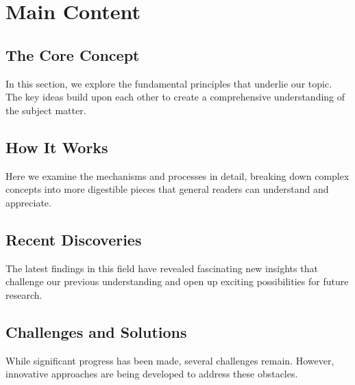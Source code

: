 %
%

\section{Main Content}
\subsection{The Core Concept}
In this section, we explore the fundamental principles that underlie our topic. 
The key ideas build upon each other to create a comprehensive understanding of the subject matter.

\subsection{How It Works}
Here we examine the mechanisms and processes in detail, breaking down complex concepts 
into more digestible pieces that general readers can understand and appreciate.

\subsection{Recent Discoveries}
The latest findings in this field have revealed fascinating new insights that challenge 
our previous understanding and open up exciting possibilities for future research.

\subsection{Challenges and Solutions}
While significant progress has been made, several challenges remain. However, innovative 
approaches are being developed to address these obstacles.
